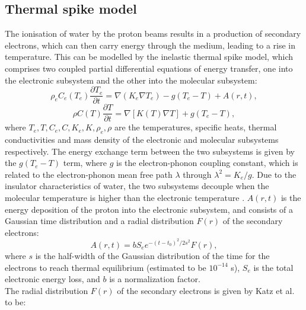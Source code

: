 \documentclass{article}
\begin{document}
\begin{multicols}{2}

\section {Thermal spike model}

The ionisation of water by the proton beams results in a production of secondary electrons, which can then carry energy through the medium, leading to a rise in temperature. This can be modelled by the inelastic thermal spike model, which comprises two coupled partial differential equations of energy transfer, one into the electronic subsystem and the other into the molecular subsystem\cite{thermalspike}:
\begin{equation}\rho_{e}C_{e}(T_{e})\frac{\partial T_{e}}{\partial t}=\nabla (K_{e}\nabla T_{e})-g(T_{e}-T)+A(r,t),
\end{equation}
\begin{equation}\rho C(T) \frac{\partial T}{\partial t}=\nabla[K(T)\nabla T]+g(T_{e}-T),
\end{equation}
where $T_{e}, T, C_{e}, C, K_{e}, K, \rho_{e}, \rho$ are the temperatures, specific heats, thermal conductivities and mass density of the electronic and molecular subsystems respectively. The energy exchange term between the two subsystems is given by the $g(T_{e}-T)$ term, where $g$ is the electron-phonon coupling constant, which is related to the electron-phonon mean free path $\lambda$ through $\lambda^{2}=K_{e}/g$. Due to the insulator characteristics of water, the two subsystems decouple when the molecular temperature is higher than the electronic temperature \cite{toulemonde25}. $A(r,t)$ is the energy deposition of the proton into the electronic subsystem\cite{energydensity}, and consists of a Gaussian time distribution and a radial distribution $F(r)$ of the secondary electrons:
\begin{equation}A(r,t)=bS_{e}e^{-(t-t_{0})^{2}/2s^{2}}F(r),
\end{equation}
where $s$ is the half-width of the Gaussian distribution of the time for the electrons to reach thermal equilibrium (estimated to be $10^{-14}$ s), $S_{e}$ is the total electronic energy loss, and $b$ is a normalization factor. \\
\indent The radial distribution $F(r)$ of the secondary electrons is given by Katz et al.\cite{katz} to be:

\end{multicols}
\end{document}
